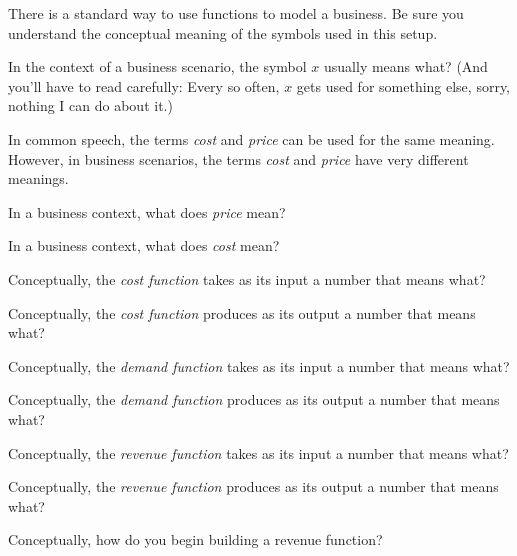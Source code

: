 
There is a standard way to use functions to model a business.
Be sure you understand the conceptual meaning of the symbols used in this setup.

\begin{ProblemSet}[pencil space=1.25in]
 \begin{Problem}
  In the context of a business scenario, the symbol $x$ usually means what?
  (And you'll have to read carefully:
  Every so often, $x$ gets used for something else, sorry, nothing I can do about it.)
 \end{Problem}
 \begin{Problem}
  In common speech, the terms \emph{cost} and \emph{price} can be used for the same meaning.
  However, in business scenarios, the terms \emph{cost} and \emph{price} have very different meanings.

  In a business context, what does \emph{price} mean?
 \end{Problem}
 \begin{Problem}
  In a business context, what does \emph{cost} mean?
 \end{Problem}
 \begin{Problem}
  Conceptually, the \emph{cost function} takes as its input a number that means what?
 \end{Problem}
 \begin{Problem}
  Conceptually, the \emph{cost function} produces as its output a number that means what?
 \end{Problem}

 \newpage

 \begin{Problem}
  Conceptually, the \emph{demand function} takes as its input a number that means what?
 \end{Problem}
 \begin{Problem}
  Conceptually, the \emph{demand function} produces as its output a number that means what?
 \end{Problem}
 \begin{Problem}
  Conceptually, the \emph{revenue function} takes as its input a number that means what?
 \end{Problem}
 \begin{Problem}
  Conceptually, the \emph{revenue function} produces as its output a number that means what?
 \end{Problem}
 \begin{Problem}
  Conceptually, how do you begin building a revenue function?
 \end{Problem}


\end{ProblemSet}
